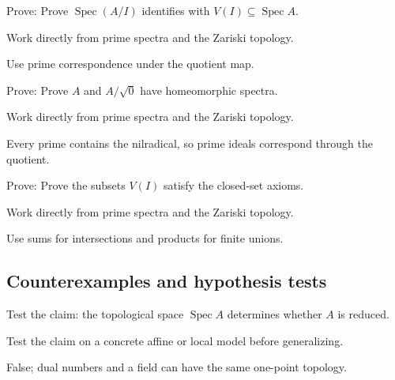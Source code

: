 \begin{exercise}\label{exr:vi07-expand-07}
Prove: Prove $\operatorname{Spec}(A/I)$ identifies with $V(I)\subseteq\operatorname{Spec}A$.
\end{exercise}
\begin{hint}
Work directly from prime spectra and the Zariski topology.
\end{hint}
\begin{solution}
Use prime correspondence under the quotient map.
\end{solution}

\begin{exercise}\label{exr:vi07-expand-08}
Prove: Prove $A$ and $A/\sqrt{0}$ have homeomorphic spectra.
\end{exercise}
\begin{hint}
Work directly from prime spectra and the Zariski topology.
\end{hint}
\begin{solution}
Every prime contains the nilradical, so prime ideals correspond through the quotient.
\end{solution}

\begin{exercise}\label{exr:vi07-expand-09}
Prove: Prove the subsets $V(I)$ satisfy the closed-set axioms.
\end{exercise}
\begin{hint}
Work directly from prime spectra and the Zariski topology.
\end{hint}
\begin{solution}
Use sums for intersections and products for finite unions.
\end{solution}

\subsection*{Counterexamples and hypothesis tests}

\begin{exercise}\label{exr:vi07-expand-10}
Test the claim: the topological space $\operatorname{Spec}A$ determines whether $A$ is reduced.
\end{exercise}
\begin{hint}
Test the claim on a concrete affine or local model before generalizing.
\end{hint}
\begin{solution}
False; dual numbers and a field can have the same one-point topology.
\end{solution}

